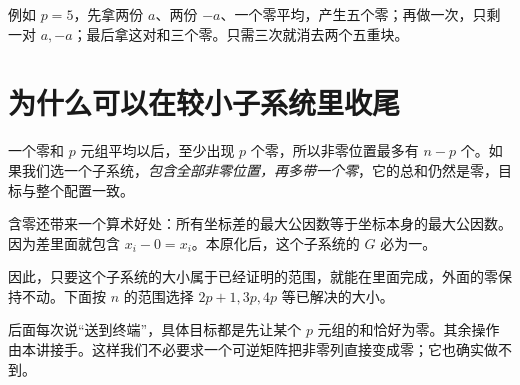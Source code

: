 例如 $p=5$，先拿两份 $a$、两份 $-a$、一个零平均，产生五个零；再做一次，只剩一对 $a,-a$；最后拿这对和三个零。只需三次就消去两个五重块。

\section{为什么可以在较小子系统里收尾}
一个零和 $p$ 元组平均以后，至少出现 $p$ 个零，所以非零位置最多有 $n-p$ 个。如果我们选一个子系统，\emph{包含全部非零位置，再多带一个零}，它的总和仍然是零，目标与整个配置一致。

含零还带来一个算术好处：所有坐标差的最大公因数等于坐标本身的最大公因数。因为差里面就包含 $x_i-0=x_i$。本原化后，这个子系统的 $G$ 必为一。

因此，只要这个子系统的大小属于已经证明的范围，就能在里面完成，外面的零保持不动。下面按 $n$ 的范围选择 $2p+1,3p,4p$ 等已解决的大小。

后面每次说“送到终端”，具体目标都是先让某个 $p$ 元组的和恰好为零。其余操作由本讲接手。这样我们不必要求一个可逆矩阵把非零列直接变成零；它也确实做不到。

